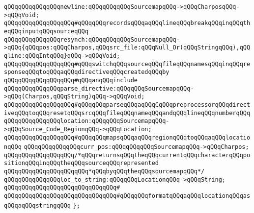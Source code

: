 \newline
\verb|qQQqqQQqqQQqqQQqnewline:qQQqqQQqqQQqSourcemapqQQq->qQQqCharposqQQq->qQQqVoid;|\newline
\verb|qQQqqQQqqQQqqQQqqQQq#qQQqqQQqrecordsqQQqaqQQqlineqQQqbreakqQQqinqQQqtheqQQqinputqQQqsourceqQQq|\newline
\newline
\verb|qQQqqQQqqQQqqQQqresynch:qQQqqQQqqQQqSourcemapqQQq->qQQq{qQQqpos:qQQqCharpos,qQQqsrc_file:qQQqNull_Or(qQQqStringqQQq),qQQqline:qQQqIntqQQq}qQQq->qQQqVoid;|\newline
\verb|qQQqqQQqqQQqqQQqqQQq#qQQqswitchqQQqsourceqQQqfileqQQqnamesqQQqinqQQqresponseqQQqtoqQQqaqQQqdirectiveqQQqcreatedqQQqby|\newline
\verb|qQQqqQQqqQQqqQQqqQQq#qQQqanqQQqinclude|\newline
\newline
\verb|qQQqqQQqqQQqqQQqparse_directive:qQQqqQQqSourcemapqQQq->qQQq(Charpos,qQQqString)qQQq->qQQqVoid;|\newline
\verb|qQQqqQQqqQQqqQQqqQQq#qQQqqQQqparseqQQqaqQQqCqQQqpreprocessorqQQqdirectiveqQQqtoqQQqresetqQQqsrcqQQqfileqQQqnameqQQqandqQQqlineqQQqnumberqQQq|\newline
\newline
\verb|qQQqqQQqqQQqqQQqlocation:qQQqqQQqSourcemapqQQq->qQQqSource_Code_RegionqQQq->qQQqLocation;|\newline
\verb|qQQqqQQqqQQqqQQqqQQq#qQQqqQQqmapsqQQqaqQQqregionqQQqtoqQQqaqQQqlocationqQQq|\newline
\newline
\verb|qQQqqQQqqQQqqQQqcurr_pos:qQQqqQQqqQQqSourcemapqQQq->qQQqCharpos;|\newline
\verb|qQQqqQQqqQQqqQQqqQQq/*qQQqreturnsqQQqtheqQQqcurrentqQQqcharacterqQQqpositionqQQqinqQQqtheqQQqsourceqQQqrepresented|\newline
\verb|qQQqqQQqqQQqqQQqqQQqqQQq*qQQqbyqQQqtheqQQqsourcemapqQQq*/|\newline
\newline
\verb|qQQqqQQqqQQqqQQqloc_to_string:qQQqqQQqLocationqQQq->qQQqString;|\newline
\verb|qQQqqQQqqQQqqQQqqQQqqQQqqQQqqQQq#|\newline
\verb|qQQqqQQqqQQqqQQqqQQqqQQqqQQqqQQq#qQQqqQQqformatqQQqaqQQqlocationqQQqasqQQqaqQQqstringqQQq|\newline
\newline
\verb|};|\newline
\newline
\newline

